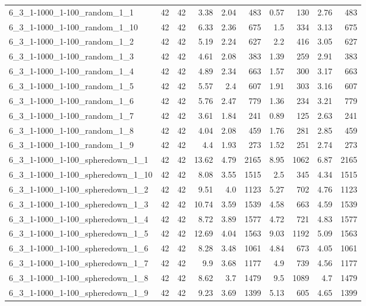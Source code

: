 \begin{center}
\begin{scriptsize}
\begin{longtable}{lrrrrrrrrr}
6\_3\_1-1000\_1-100\_random\_1\_1 & 42 & 42 & 3.38 & 2.04 & 483 & 0.57 & 130 & 2.76 & 483\\
6\_3\_1-1000\_1-100\_random\_1\_10 & 42 & 42 & 6.33 & 2.36 & 675 & 1.5 & 334 & 3.13 & 675\\
6\_3\_1-1000\_1-100\_random\_1\_2 & 42 & 42 & 5.19 & 2.24 & 627 & 2.2 & 416 & 3.05 & 627\\
6\_3\_1-1000\_1-100\_random\_1\_3 & 42 & 42 & 4.61 & 2.08 & 383 & 1.39 & 259 & 2.91 & 383\\
6\_3\_1-1000\_1-100\_random\_1\_4 & 42 & 42 & 4.89 & 2.34 & 663 & 1.57 & 300 & 3.17 & 663\\
6\_3\_1-1000\_1-100\_random\_1\_5 & 42 & 42 & 5.57 & 2.4 & 607 & 1.91 & 303 & 3.16 & 607\\
6\_3\_1-1000\_1-100\_random\_1\_6 & 42 & 42 & 5.76 & 2.47 & 779 & 1.36 & 234 & 3.21 & 779\\
6\_3\_1-1000\_1-100\_random\_1\_7 & 42 & 42 & 3.61 & 1.84 & 241 & 0.89 & 125 & 2.63 & 241\\
6\_3\_1-1000\_1-100\_random\_1\_8 & 42 & 42 & 4.04 & 2.08 & 459 & 1.76 & 281 & 2.85 & 459\\
6\_3\_1-1000\_1-100\_random\_1\_9 & 42 & 42 & 4.4 & 1.93 & 273 & 1.52 & 251 & 2.74 & 273\\
6\_3\_1-1000\_1-100\_spheredown\_1\_1 & 42 & 42 & 13.62 & 4.79 & 2165 & 8.95 & 1062 & 6.87 & 2165\\
6\_3\_1-1000\_1-100\_spheredown\_1\_10 & 42 & 42 & 8.08 & 3.55 & 1515 & 2.5 & 345 & 4.34 & 1515\\
6\_3\_1-1000\_1-100\_spheredown\_1\_2 & 42 & 42 & 9.51 & 4.0 & 1123 & 5.27 & 702 & 4.76 & 1123\\
6\_3\_1-1000\_1-100\_spheredown\_1\_3 & 42 & 42 & 10.74 & 3.59 & 1539 & 4.58 & 663 & 4.59 & 1539\\
6\_3\_1-1000\_1-100\_spheredown\_1\_4 & 42 & 42 & 8.72 & 3.89 & 1577 & 4.72 & 721 & 4.83 & 1577\\
6\_3\_1-1000\_1-100\_spheredown\_1\_5 & 42 & 42 & 12.69 & 4.04 & 1563 & 9.03 & 1192 & 5.09 & 1563\\
6\_3\_1-1000\_1-100\_spheredown\_1\_6 & 42 & 42 & 8.28 & 3.48 & 1061 & 4.84 & 673 & 4.05 & 1061\\
6\_3\_1-1000\_1-100\_spheredown\_1\_7 & 42 & 42 & 9.9 & 3.68 & 1177 & 4.9 & 739 & 4.56 & 1177\\
6\_3\_1-1000\_1-100\_spheredown\_1\_8 & 42 & 42 & 8.62 & 3.7 & 1479 & 9.5 & 1089 & 4.7 & 1479\\
6\_3\_1-1000\_1-100\_spheredown\_1\_9 & 42 & 42 & 9.23 & 3.69 & 1399 & 5.13 & 605 & 4.65 & 1399\\

\end{longtable}
\end{scriptsize}
\end{center}
